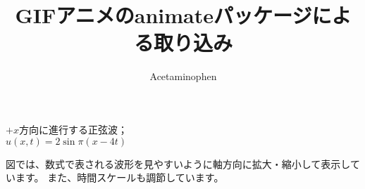 \documentclass{jsarticle}
\title{GIFアニメのanimateパッケージによる取り込み}
\author{Acetaminophen}
\begin{document}
\maketitle

$+x$方向に進行する正弦波； \\ \qquad
$u(x,t) = 2 \sin \pi (x - 4t)$
\begin{figure}[ht]
\centering
{}
\end{figure}

図では、数式で表される波形を見やすいように軸方向に拡大・縮小して表示しています。
また、時間スケールも調節しています。
\end{document}
